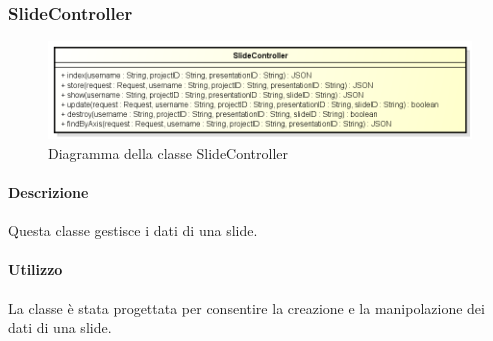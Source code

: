 \newpage
\subsubsection{SlideController}
\begin{figure}[h]
\centering
\includegraphics[width=0.8\linewidth]{img/back_end_http_controllers_slideController}
\caption[Diagramma della classe SlideController]{Diagramma della classe SlideController}
\label{fig:back_end_http_controllers_slideController}
\end{figure}

	\paragraph{Descrizione}
		Questa classe gestisce i dati di una \gls{slide}.
	\paragraph{Utilizzo}
		La classe è stata progettata per consentire la creazione e la manipolazione dei dati di una \gls{slide}.

